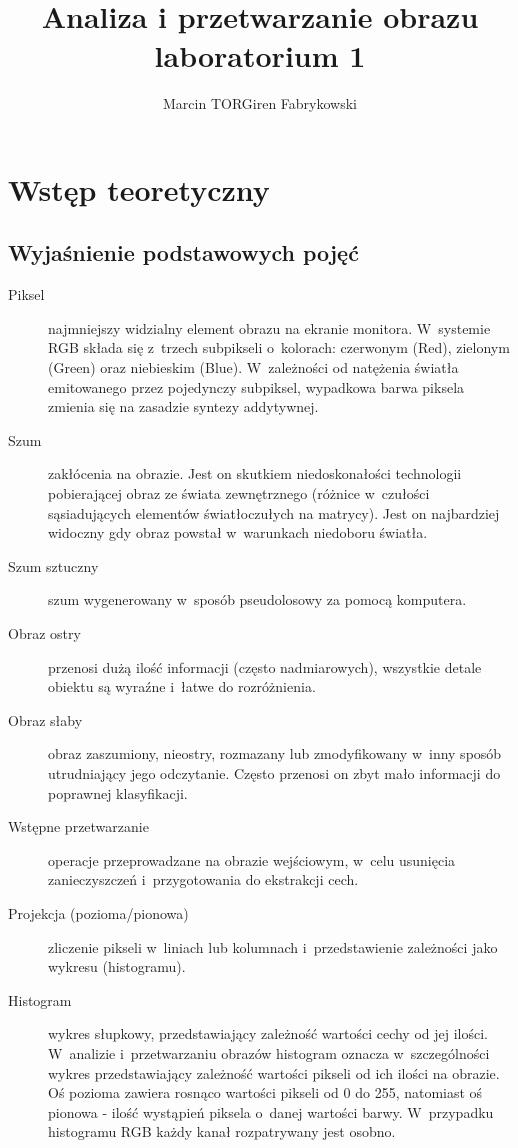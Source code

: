 \documentclass[12pt,a4paper]{article}
\author{Marcin TORGiren Fabrykowski}
\title{Analiza i przetwarzanie obrazu\\laboratorium 1}
\begin{document}
\lstset{language=Python}
\maketitle
\newpage
\section{Wstęp teoretyczny}
\subsection{Wyjaśnienie podstawowych pojęć}
\begin{description}
\item[Piksel] najmniejszy widzialny element obrazu na ekranie monitora. W~systemie RGB składa się z~trzech subpikseli o~kolorach: czerwonym (Red), zielonym (Green) oraz niebieskim (Blue). W~zależności od natężenia światła emitowanego przez pojedynczy subpiksel, wypadkowa barwa piksela zmienia się na zasadzie syntezy addytywnej. 
\item[Szum] zakłócenia na obrazie. Jest on skutkiem niedoskonałości technologii pobierającej obraz ze świata zewnętrznego (różnice w~czułości sąsiadujących elementów światłoczułych na matrycy). Jest on najbardziej widoczny gdy obraz powstał w~warunkach niedoboru światła. 
\item[Szum sztuczny] szum wygenerowany w~sposób pseudolosowy za pomocą komputera.
\item[Obraz ostry] przenosi dużą ilość informacji (często nadmiarowych), wszystkie detale obiektu są wyraźne i~łatwe do rozróżnienia.
\item[Obraz słaby] obraz zaszumiony, nieostry, rozmazany lub zmodyfikowany w~inny sposób utrudniający jego odczytanie. Często przenosi on zbyt mało informacji do poprawnej klasyfikacji.
\item[Wstępne przetwarzanie] operacje przeprowadzane na obrazie wejściowym, w~celu usunięcia zanieczyszczeń i~przygotowania do ekstrakcji cech.
\item[Projekcja (pozioma/pionowa)] zliczenie pikseli w~liniach lub kolumnach i~przedstawienie zależności jako wykresu (histogramu).
\item[Histogram] wykres słupkowy, przedstawiający zależność wartości cechy od jej ilości. W~analizie i~przetwarzaniu obrazów histogram oznacza w~szczególności wykres przedstawiający zależność wartości pikseli od ich ilości na obrazie. Oś pozioma zawiera rosnąco wartości pikseli od 0 do 255, natomiast oś pionowa - ilość wystąpień piksela o~danej wartości barwy. W~przypadku histogramu RGB każdy kanał rozpatrywany jest osobno.
\end{description}
\end{document}
